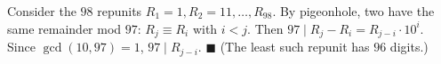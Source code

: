 Consider the $98$ repunits $R_1=1,R_2=11,\dots,R_{98}$. By pigeonhole, two have the same remainder mod $97$: $R_j\equiv R_i$ with $i<j$. Then $97\mid R_j-R_i=R_{j-i}\cdot10^i$. Since $\gcd(10,97)=1$, $97\mid R_{j-i}$. $\blacksquare$ (The least such repunit has $96$ digits.)
